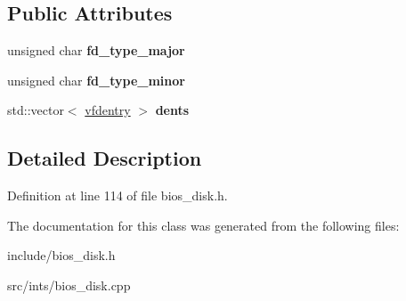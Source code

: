 \subsection*{Public Attributes}
\begin{DoxyCompactItemize}
\item 
\hypertarget{classimageDiskD88_ac78893683ee0ae39a20c484f66f4b93c}{unsigned char {\bfseries fd\-\_\-type\-\_\-major}}\label{classimageDiskD88_ac78893683ee0ae39a20c484f66f4b93c}

\item 
\hypertarget{classimageDiskD88_adee44970e1d1ef3ddb7c59074121afb6}{unsigned char {\bfseries fd\-\_\-type\-\_\-minor}}\label{classimageDiskD88_adee44970e1d1ef3ddb7c59074121afb6}

\item 
\hypertarget{classimageDiskD88_a9bff60346c5b14b0728d958cdcd4053a}{std\-::vector$<$ \hyperlink{structimageDiskD88_1_1vfdentry}{vfdentry} $>$ {\bfseries dents}}\label{classimageDiskD88_a9bff60346c5b14b0728d958cdcd4053a}

\end{DoxyCompactItemize}


\subsection{Detailed Description}


Definition at line 114 of file bios\-\_\-disk.\-h.



The documentation for this class was generated from the following files\-:\begin{DoxyCompactItemize}
\item 
include/bios\-\_\-disk.\-h\item 
src/ints/bios\-\_\-disk.\-cpp\end{DoxyCompactItemize}
